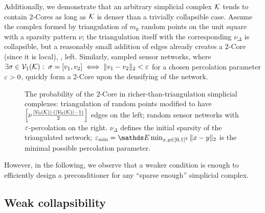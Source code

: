 Additionally, we demonstrate that an arbitrary simplicial complex \(\mathcal{K}\) tends to contain \(2\)-Cores as long as \( \mathcal{K} \) is denser than a trivially collapsible case. Assume the complex formed by triangulation of \( m_0 \) random points on the unit square with a sparsity pattern \( \nu \); the triangulation itself with the corresponding \( \nu_\Delta \) is collapsible, but a reasonably small addition of edges already creates a \(2\)-Core (since it is local), , left. Similarly, sampled sensor networks, where \( \exists \sigma \in \mathcal{V}_{1}(\mathcal{K}): \; \sigma = [v_1, v_2] \iff \| v_1 - v_2 \|_2 < \varepsilon \) for a chosen percolation parameter \( \varepsilon > 0 \), quickly form a 2-Core upon the densifying of the network.

\begin{figure}[htbp]
      \centering
      \scalebox{0.4}{
            
      }%
      \scalebox{0.4}{
            
      }
      \caption{ The probability of the \( 2 \)-Core in richer-than-triangulation simplicial complexes: triangulation of random points modified to have \( \left[ \nu \frac{ | \mathcal{V}_{0}(\mathcal{K}) | \cdot ( | \mathcal{V}_{0}(\mathcal{K}) | - 1 ) }{2} \right] \) edges on the left; random sensor networks with \( \varepsilon \)-percolation on the right. \( \nu_\Delta \) defines the initial sparsity of the triangulated network; \(\eps_{\min} = \ds E \min_{x, y \in [0, 1]^2} \| x - y\|_2 \) is the minimal possible percolation parameter. \label{fig:core_prob} }
\end{figure}

However, in the following, we observe that a weaker condition is enough to efficiently design a preconditioner for any ``sparse enough'' simplicial complex.

\subsection{Weak collapsibility}


